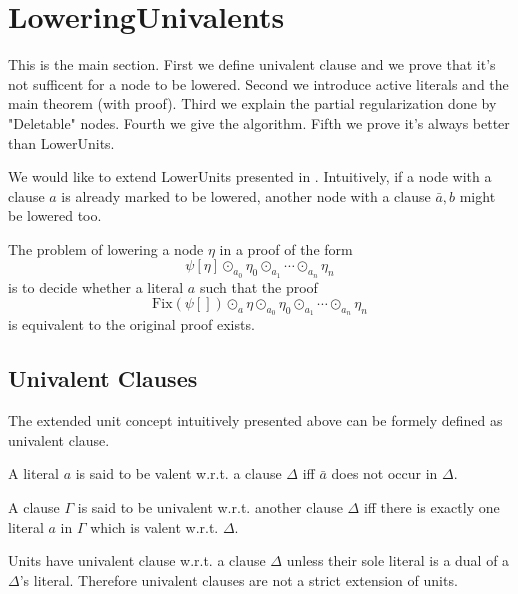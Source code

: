 \documentclass{llncs}
\newenvironment{jogo}{\color{teal}}{}
\begin{document}
\section{LoweringUnivalents}

\begin{jogo}
This is the main section. First we define univalent clause and we prove that it's not sufficent for
a node to be lowered. Second we introduce active literals and the main theorem (with proof). Third
we explain the partial regularization done by "Deletable" nodes. Fourth we give the algorithm. Fifth
we prove it's always better than LowerUnits.
\end{jogo}

We would like to extend LowerUnits presented in \cite{LURPI}. Intuitively,
if a node with a clause $a$ is already marked to be lowered, another node with
a clause $\bar{a},b$ might be lowered too.

The problem of lowering a node $\eta$ in a proof of the form
\begin{equation}
\psi[\eta] \odot_{a_0} \eta_0 \odot_{a_1} \cdots \odot_{a_n} \eta_n
\end{equation}
is to decide whether a literal $a$ such that the proof 
\begin{equation}
\text{Fix}\left(\psi[]\right) \odot_a \eta \odot_{a_0} \eta_0 \odot_{a_1} \cdots \odot_{a_n} \eta_n
\end{equation}
is equivalent to
the original proof exists.
\subsection{Univalent Clauses}

The extended unit concept intuitively presented above can be formely defined as
univalent clause.

\begin{definition}
A literal $a$ is said to be valent w.r.t. a clause $\Delta$ iff $\bar{a}$ does
not occur in $\Delta$.
\end{definition}

\begin{definition}
A clause $\Gamma$ is said to be univalent w.r.t. another clause $\Delta$ iff
there is exactly one literal $a$ in $\Gamma$ which is valent w.r.t. $\Delta$.
\end{definition}

Units have univalent clause w.r.t. a clause $\Delta$ unless their sole literal
is a dual of a $\Delta$'s literal. Therefore univalent clauses are not a
strict extension of units.
\end{document}
